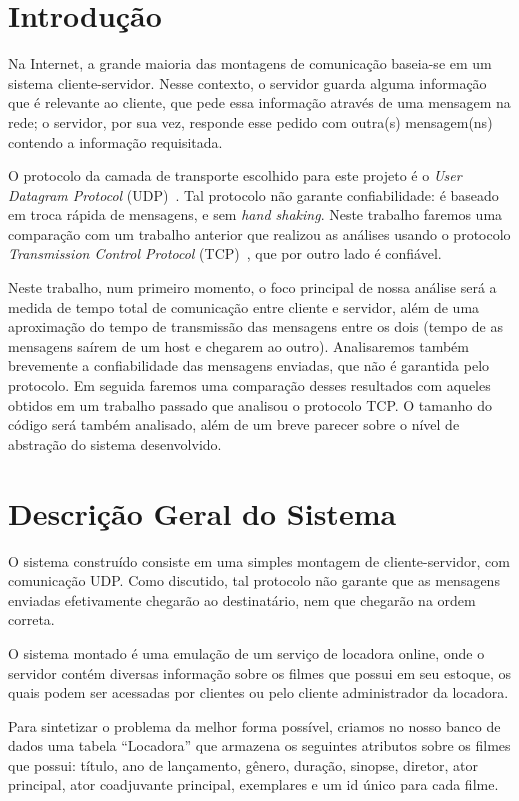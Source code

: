 \documentclass[12pt,a4paper]{article}
\begin{document}
\section{Introdução}
Na Internet, a grande maioria das montagens de comunicação baseia-se em um sistema cliente-servidor. Nesse contexto, o servidor guarda alguma informação que é relevante ao cliente, que pede essa informação através de uma mensagem na rede; o servidor, por sua vez, responde esse pedido com outra(s) mensagem(ns) contendo a informação requisitada.

O protocolo da camada de transporte escolhido para este projeto é o {\it User Datagram Protocol} (UDP)~\cite{postel1980user}. Tal protocolo não garante confiabilidade: é baseado em troca rápida de mensagens, e sem {\it hand shaking}. Neste trabalho faremos uma comparação com um trabalho anterior que realizou as análises usando o protocolo {\it Transmission Control Protocol} (TCP)~\cite{postel1981transmission}, que por outro lado é confiável.

Neste trabalho, num primeiro momento, o foco principal de nossa análise será a medida de tempo total de comunicação entre cliente e servidor, além de uma aproximação do tempo de transmissão das mensagens entre os dois (tempo de as mensagens saírem de um host e chegarem ao outro). Analisaremos também brevemente a confiabilidade das mensagens enviadas, que não é garantida pelo protocolo. Em seguida faremos uma comparação desses resultados com aqueles obtidos em um trabalho passado que analisou o protocolo TCP. O tamanho do código será também analisado, além de um breve parecer sobre o nível de abstração do sistema desenvolvido.

\section{Descrição Geral do Sistema}

O sistema construído consiste em uma simples montagem de cliente-servidor, com comunicação UDP. Como discutido, tal protocolo não garante que as mensagens enviadas efetivamente chegarão ao destinatário, nem que chegarão na ordem correta.

    O sistema montado é uma emulação de um serviço de locadora online, onde o servidor contém diversas informação sobre os filmes que possui em seu estoque, os quais podem ser acessadas por clientes ou pelo cliente administrador da locadora. 
    
    Para sintetizar o problema da melhor forma possível, criamos no nosso banco de dados uma tabela “Locadora” que armazena os seguintes atributos sobre os filmes que possui: título, ano de lançamento, gênero, duração, sinopse, diretor, ator principal, ator coadjuvante principal, exemplares e um id único para cada filme. 
    
\end{document}
